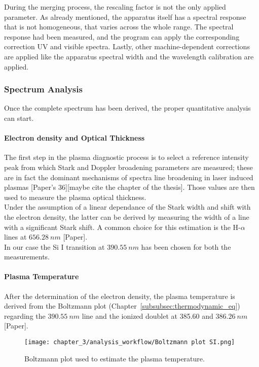 During the merging process, the rescaling factor is not the only applied parameter. As already mentioned, the apparatus itself has a spectral response that is not homogeneous, that varies across the whole range. The spectral response had been measured, and the program can apply the corresponding correction UV and visible spectra. Lastly, other machine-dependent corrections are applied like the apparatus spectral width and the wavelength calibration are applied.

\subsubsection{Spectrum Analysis}
\label{subsubsec:spectrum_analysis}
Once the complete spectrum has been derived, the proper quantitative analysis can start. 

\paragraph{Electron density and Optical Thickness}
\label{par:electron_density_opt_thick}
The first step in the plasma diagnostic process is to select a reference intensity peak from which Stark and Doppler broadening parameters are measured; these are in fact the dominant mechanisms of spectra line broadening in laser induced plasmas [Paper’s 36][maybe cite the chapter of the thesis]. Those values are then used to measure the plasma optical thickness.
\\
Under the assumption of a linear dependance of the Stark width and shift with the electron density, the latter can be derived by measuring the width of a line with a significant Stark shift. A common choice for this estimation is the H-$\alpha$ lines at $656.28\:nm$ [Paper].
\\
In our case the Si I transition at $390.55 \: nm$ has been chosen for both the measurements.
\paragraph{Plasma Temperature}
\label{par:plasma_temperature}
After the determination of the electron density, the plasma temperature is derived from the Boltzmann plot (Chapter~\ref{subsubsec:thermodynamic_eq}) regarding the  $390.55\:nm$ line and the ionized  doublet at 385.60 and $386.26\:nm$ [Paper].


\begin{figure}[H]
    \centering
    \texttt{[image: chapter\_3/analysis\_workflow/Boltzmann plot SI.png]} 
    \caption{Boltzmann plot used to estimate the plasma temperature. }
    \label{fig:boltzmann_plot}
\end{figure}


